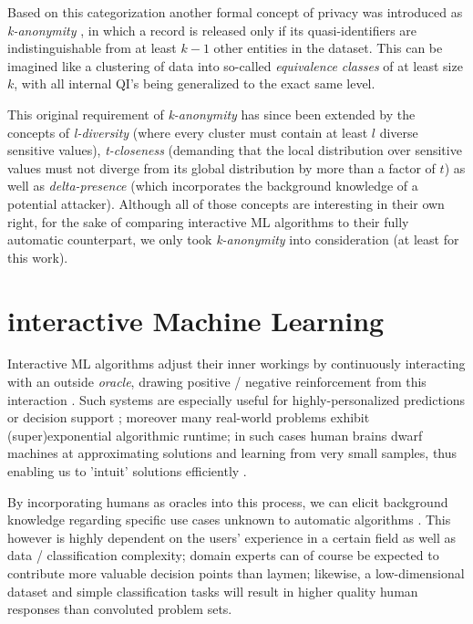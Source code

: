 \documentclass{llncs}
\begin{document}
Based on this categorization another formal concept of privacy was introduced as \textit{k-anonymity} \cite{Samarati:2001:kAnonymity}, in which a record is released only if its quasi-identifiers are indistinguishable from at least $k-1$ other entities in the dataset. This can be imagined like a clustering of data into so-called \textit{equivalence classes} of at least size $k$, with all internal QI's being generalized to the exact same level.

This original requirement of \textit{k-anonymity} \cite{Sweeney:2002:k-Anonymity} has since been extended by the concepts of \textit{l-diversity} \cite{MachanavajjhalaEtAl:2007:l-Diversity} (where every cluster must contain at least $l$ diverse sensitive values), \textit{t-closeness} \cite{LiEtAl:2007:t-closeness} (demanding that the local distribution over sensitive values must not diverge from its global distribution by more than a factor of $t$) as well as \textit{delta-presence} \cite{NergizClifton:2010:Delta-Presence} (which incorporates the background knowledge of a potential attacker). Although all of those concepts are interesting in their own right, for the sake of comparing interactive ML algorithms to  their fully automatic counterpart, we only took \textit{k-anonymity} into consideration (at least for this work).



\section{interactive Machine Learning}
\label{sect:iML}

Interactive ML algorithms adjust their inner workings by continuously interacting with an outside \textit{oracle}, drawing positive / negative reinforcement from this interaction \cite{Holzinger:2016:iML}. Such systems are especially useful for highly-personalized predictions or decision support \cite{Kieseberg:2016:Doctor-in-the-Loop}; moreover many real-world problems exhibit (super)exponential algorithmic runtime; in such cases human brains dwarf machines at approximating solutions and learning from very small samples, thus enabling us to 'intuit' solutions efficiently \cite{iMLExperiment}.

By incorporating humans as oracles into this process, we can elicit background knowledge regarding specific use cases unknown to automatic algorithms \cite{WARE2001}. This however is highly dependent on the users' experience in a certain field as well as data / classification complexity; domain experts can of course be expected to contribute more valuable decision points than laymen; likewise, a low-dimensional dataset and simple classification tasks will result in higher quality human responses than convoluted problem sets.
\end{document}
